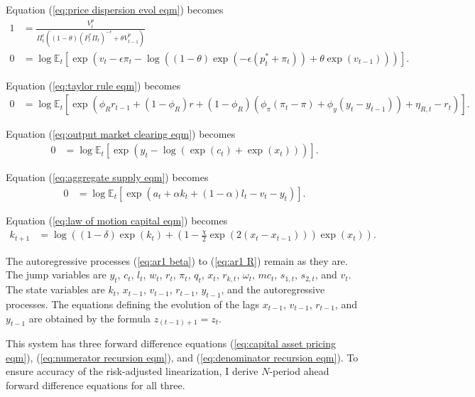 \documentclass[12 pt, oneside]{article}
\theoremstyle{definition}
\theoremstyle{definition}
\theoremstyle{definition}
\newcommand{\E}{\mathbb{E}}
\begin{document}
Equation (\ref{eq:price dispersion evol eqm}) becomes
\begin{align*}
  1 & = \frac{V_t^p}{\Pi_t^\epsilon((1 - \theta) (P_t^*\Pi_t)^{-\epsilon} + \theta V_{t - 1}^p)}\\
  0 & = \log\E_t\left[\exp\left(v_t - \epsilon \pi_t - \log((1 - \theta) \exp(-\epsilon(p_t^* + \pi_t)) + \theta \exp(v_{t - 1}))\right)\right].
\end{align*}

Equation (\ref{eq:taylor rule eqm}) becomes
\begin{align*}
  0 & = \log\E_t\left[\exp\left(\phi_R r_{t - 1} + (1 - \phi_R)r + (1 - \phi_R)(\phi_\pi(\pi_t - \pi) + \phi_y(y_t - y_{t - 1})) + \eta_{R, t} - r_t\right)\right].
\end{align*}

Equation (\ref{eq:output market clearing eqm}) becomes
\begin{align*}
  0 & = \log\E_t\left[\exp(y_t - \log(\exp(c_t) + \exp(x_t)))\right].
\end{align*}

Equation (\ref{eq:aggregate supply eqm}) becomes
\begin{align*}
  0 & = \log\E_t\left[\exp(a_t + \alpha k_t + (1 - \alpha)l_t - v_t - y_t)\right].
\end{align*}

Equation (\ref{eq:law of motion capital eqm}) becomes
\begin{align*}
  k_{t + 1} & = \log\left((1 - \delta)\exp(k_t) +  \left(1 - \frac{\chi}{2}\exp(2(x_t - x_{t - 1}))\right)\exp(x_t)\right).
\end{align*}

The autoregressive processes (\ref{eq:ar1 beta}) to (\ref{eq:ar1 R}) remain as they are.\\

The jump variables are $y_t$, $c_t$, $l_t$, $w_t$, $r_t$, $\pi_t$, $q_t$, $x_t$, $r_{k, t}$, $\omega_t$, $mc_t$, $s_{1, t}$, $s_{2, t}$, and $v_t$.
The state variables are $k_t$, $x_{t - 1}$, $v_{t - 1}$, $r_{t - 1}$, $y_{t - 1}$, and the autoregressive processes. The equations defining the evolution of the lags $x_{t - 1}$, $v_{t - 1}$, $r_{t - 1}$, and $y_{t - 1}$ are obtained by the formula $z_{(t - 1) + 1} = z_t$.


This system has three forward difference equations (\ref{eq:capital asset pricing eqm}), (\ref{eq:numerator recursion eqm}), and
(\ref{eq:denominator recursion eqm}). To ensure accuracy of the risk-adjusted linearization, I derive $N$-period
ahead forward difference equations for all three.\\
\end{document}
